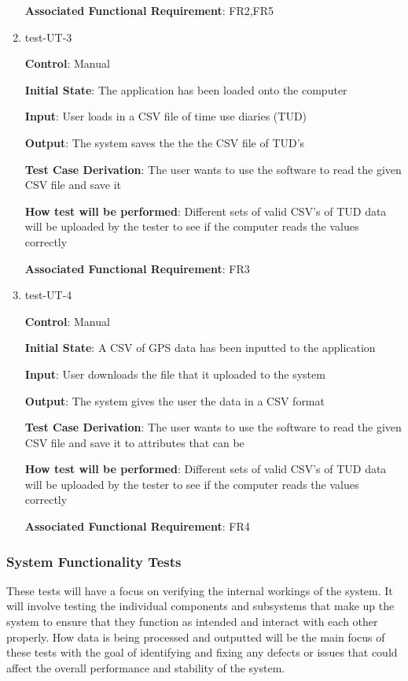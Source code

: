 \documentclass[12pt, titlepage]{article}
\begin{document}
\begin{enumerate}
\textbf{Associated Functional Requirement}: FR2,FR5

\item{test-UT-3\\}

\textbf{Control}: Manual 
					
\textbf{Initial State}: The application has been loaded onto the computer
					
\textbf{Input}: User loads in a CSV file of time use diaries (TUD)
					
\textbf{Output}: The system saves the the the CSV file of TUD's

\textbf{Test Case Derivation}: The user wants to use the software to read the given CSV file and save it
					
\textbf{How test will be performed}: Different sets of valid CSV's of TUD data will be uploaded by the tester to see if the computer reads the values correctly

\textbf{Associated Functional Requirement}: FR3

\item{test-UT-4\\}

\textbf{Control}: Manual 
					
\textbf{Initial State}: A CSV of GPS data has been inputted to the application
					
\textbf{Input}: User downloads the file that it uploaded to the system 
					
\textbf{Output}: The system gives the user the data in a CSV format 

\textbf{Test Case Derivation}: The user wants to use the software to read the given CSV file and save it to attributes that can be 
					
\textbf{How test will be performed}: Different sets of valid CSV's of TUD data will be uploaded by the tester to see if the computer reads the values correctly

\textbf{Associated Functional Requirement}: FR4
\end{enumerate}

\subsubsection{System Functionality Tests}

These tests will have a focus on verifying the internal workings of the system. It will involve testing the individual components and subsystems that make up the system to ensure that they function as intended and interact with each other properly. How data is being processed and outputted will be the main focus of these tests with the goal of identifying and fixing any defects or issues that could affect the overall performance and stability of the system.
\end{document}
